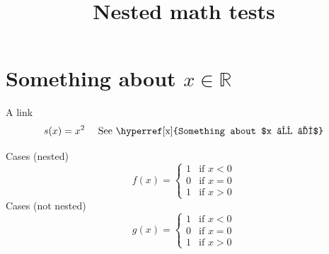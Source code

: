 \documentclass{article}
\title{Nested math tests}
\begin{document}
\section{\label{x}Something about $x ∈ ℝ$}

A link 
\[
  s(x) = x^2 \quad \text{ See \hyperref[x]{Something about $x ∈ ℝ$}}
\]

Cases (nested)
\[
f(x)=
\begin{cases}
  1 & \text{if $x<0$} \\
  0 & \text{if $x=0$} \\
  1 & \text{if $x>0$}          
\end{cases}
\]
Cases (not nested)
\[
g(x)=
\begin{cases}
  1 & \text{if } x<0 \\
  0 & \text{if } x=0 \\
  1 & \text{if } x>0          
\end{cases}
\]
\end{document}
